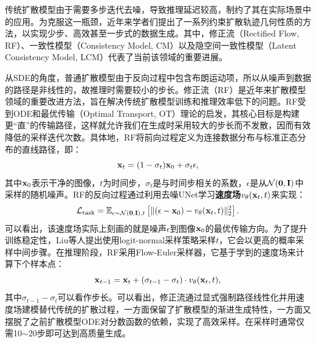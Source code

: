 \documentclass[11pt,a4paper,UTF8]{ctexart}
\begin{document}
传统扩散模型由于需要多步迭代去噪，导致推理延迟较高，制约了其在实际场景中的应用。为克服这一瓶颈，近年来学者们提出了一系列约束扩散轨迹几何性质的方法，以实现少步、高效甚至一步式的数据生成。其中，修正流（Rectified Flow, RF）\cite{liu2022flow}、一致性模型（Consistency Model, CM）\cite{pmlr-v202-song23a}以及隐空间一致性模型（Latent Consistency Model, LCM）\cite{luo2023latent}代表了当前该领域的重要进展。


从SDE的角度，普通扩散模型由于反向过程中包含布朗运动项，所以从噪声到数据的路径是非线性的，故推理时需要较小的步长。修正流（RF）\cite{liu2022flow}是近年来扩散模型领域的重要改进方法，旨在解决传统扩散模型训练和推理效率低下的问题。RF受到ODE和最优传输（Optimal Transport, OT）理论的启发，其核心目标是构建更“直”的传输路径，这样就允许我们在生成时采用较大的步长而不发散，因而有效降低的采样迭代次数。具体地，RF将前向过程定义为连接数据分布与标准正态分布的直线路径，即：
\begin{equation*}
    \mathbf{x}_t = (1-\sigma_t)\mathbf{x}_0 + \sigma_t\epsilon,
\end{equation*}
其中$\mathbf{x}_0$表示干净的图像，$t$为时间步，$\sigma_t$是与时间步相关的系数，$\epsilon$是从$\mathcal{N}(\mathbf{0},\mathbf{I})$中采样的随机噪声。RF的反向过程通过利用去噪UNet学习\textbf{速度场}$v_\theta(\mathbf{x}_t,t)$来实现：
\begin{equation*}
    \mathcal{L}_{\text{task}} =\mathbb{E}_{\epsilon\sim\mathcal{N}(\mathbf{0},\mathbf{I}),t}\left[\|(\epsilon-\mathbf{x}_0) - v_\theta(\mathbf{x}_t,t)\|_2^2\right].
\end{equation*}
可以看出，该速度场实际上刻画的就是噪声$\epsilon$到图像$\mathbf{x}_0$的最优传输方向。为了提升训练稳定性，Liu等人\cite{liu2022flow}提出使用logit-normal采样策略采样$t$，它会以更高的概率采样中间步骤。在推理阶段，RF采用Flow-Euler采样器，它基于学到的速度场来计算下个样本点：
\begin{equation*}
    \mathbf{x}_{t-1} = \mathbf{x}_t + (\sigma_{t-1} - \sigma_t)\cdot v_\theta(\mathbf{x}_t,t),
\end{equation*}
其中$\sigma_{t-1} - \sigma_t$可以看作步长。可以看出，修正流通过显式强制路径线性化并用速度场建模替代传统的扩散过程，一方面保留了扩散模型的渐进生成特性，一方面又摆脱了之前扩散模型ODE对分数函数的依赖，实现了高效采样。在采样时通常仅需10$\sim$20步即可达到高质量生成。
\end{document}

